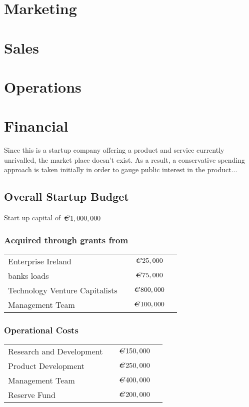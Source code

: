\documentclass[a4paper,12pt]{article}
\newcommand{\euro}{\kern.17em{}C\kern-.95em\raise.19ex\hbox{\it
=\/}\kern.17em{}}
\begin{document}
\section{Marketing}

\section{Sales}

\section{Operations}

\section{Financial}

Since this is a startup company offering a product and service currently
unrivalled, the market place doesn't exist. As a result, a conservative
spending approach is taken initially in order to gauge public interest 
in the product...

\subsection{Overall Startup Budget}

Start up capital of $\euro 1,000,000$

\subsubsection{Acquired through grants from}

\begin{tabular}{lccr}
Enterprise Ireland								&	&	$\euro 25,000$ \\
banks loads											&	&	$\euro 75,000$ \\
Technology Venture Capitalists				&	&	$\euro 800,000$\\
Management Team									&	&	$\euro 100,000$
\end{tabular}

\subsubsection{Operational Costs}

\begin{tabular}{lccr}
Research and Development						&	&	$\euro 150,000$ \\
Product Development     						&	&	$\euro 250,000$ \\
Management Team         						&	&	$\euro 400,000$ \\
Reserve Fund   						         &	&	$\euro 200,000$
\end{tabular}
\end{document}
